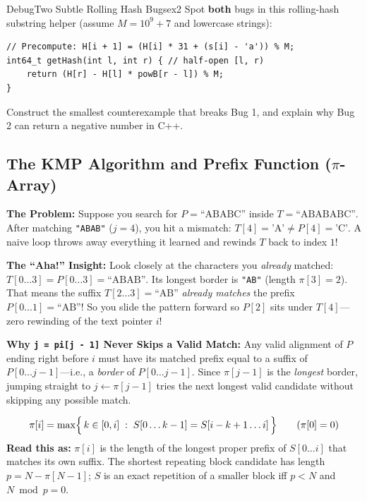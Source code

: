\documentclass[11pt,a4paper]{article}
\theoremstyle{definition}
\newcommand{\painbeat}{\textbf{\color{accentamber}The Problem:} }
\newcommand{\ahabeat}{\textbf{\color{accentteal}The ``Aha!'' Insight:} }
\begin{document}
\begin{tryitbox}{Debug}{Two Subtle Rolling Hash Bugs}{ex2}
Spot \textbf{both} bugs in this rolling-hash substring helper (assume $M = 10^9 + 7$ and lowercase strings):
\begin{lstlisting}[numbers=none, xleftmargin=4pt, framexleftmargin=4pt]
// Precompute: H[i + 1] = (H[i] * 31 + (s[i] - 'a')) % M;
int64_t getHash(int l, int r) { // half-open [l, r)
    return (H[r] - H[l] * powB[r - l]) % M;
}
\end{lstlisting}
Construct the smallest counterexample that breaks Bug 1, and explain why Bug 2 can return a negative number in C++.
\end{tryitbox}

\subsection{The KMP Algorithm and Prefix Function ($\pi$-Array)}

\painbeat Suppose you search for $P = \text{``ABABC''}$ inside $T = \text{``ABABABC''}$. After matching \texttt{"ABAB"} ($j = 4$), you hit a mismatch: $T[4] = \text{'A'} \neq P[4] = \text{'C'}$. A naive loop throws away everything it learned and rewinds $T$ back to index $1$!

\ahabeat Look closely at the characters you \emph{already} matched: $T[0 \dots 3] = P[0 \dots 3] = \text{``ABAB''}$. Its longest border is \texttt{"AB"} (length $\pi[3] = 2$). That means the suffix $T[2 \dots 3] = \text{``AB''}$ \emph{already matches} the prefix $P[0 \dots 1] = \text{``AB''}$! So you slide the pattern forward so $P[2]$ sits under $T[4]$---zero rewinding of the text pointer $i$!

\textbf{Why \texttt{j = pi[j - 1]} Never Skips a Valid Match:} Any valid alignment of $P$ ending right before $i$ must have its matched prefix equal to a suffix of $P[0 \dots j - 1]$---i.e., a \emph{border} of $P[0 \dots j - 1]$. Since $\pi[j - 1]$ is the \emph{longest} border, jumping straight to $j \leftarrow \pi[j - 1]$ tries the next longest valid candidate without skipping any possible match.

\begin{formulabox}
\[
    \pi[i] = \max\Bigl\{\, k \in [0, i] \;:\; S[0 \dots k - 1] = S[i - k + 1 \dots i] \,\Bigr\} \qquad (\pi[0] = 0)
\]
\textbf{Read this as:} $\pi[i]$ is the length of the longest proper prefix of $S[0 \dots i]$ that matches its own suffix. The shortest repeating block candidate has length $p = N - \pi[N - 1]$; $S$ is an exact repetition of a smaller block iff $p < N$ and $N \bmod p = 0$.
\end{formulabox}
\end{document}
